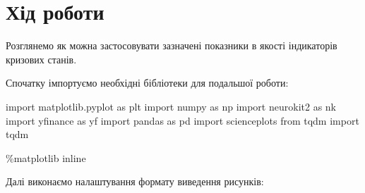 \documentclass[
  letterpaper,
]{report}
\newenvironment{Shaded}{\begin{snugshade}}{\end{snugshade}}
\newcommand{\ImportTok}[1]{\textcolor[rgb]{0.00,0.46,0.62}{#1}}
\newcommand{\NormalTok}[1]{\textcolor[rgb]{0.00,0.23,0.31}{#1}}
\newcommand{\OperatorTok}[1]{\textcolor[rgb]{0.37,0.37,0.37}{#1}}
\begin{document}
\hypertarget{ux445ux456ux434-ux440ux43eux431ux43eux442ux438-5}{%
\section{Хід
роботи}\label{ux445ux456ux434-ux440ux43eux431ux43eux442ux438-5}}

Розглянемо як можна застосовувати зазначені показники в якості
індикаторів кризових станів.

Спочатку імпортуємо необхідні бібліотеки для подальшої роботи:

\begin{Shaded}
\begin{Highlighting}[]
\ImportTok{import}\NormalTok{ matplotlib.pyplot }\ImportTok{as}\NormalTok{ plt }
\ImportTok{import}\NormalTok{ numpy }\ImportTok{as}\NormalTok{ np}
\ImportTok{import}\NormalTok{ neurokit2 }\ImportTok{as}\NormalTok{ nk}
\ImportTok{import}\NormalTok{ yfinance }\ImportTok{as}\NormalTok{ yf}
\ImportTok{import}\NormalTok{ pandas }\ImportTok{as}\NormalTok{ pd}
\ImportTok{import}\NormalTok{ scienceplots}
\ImportTok{from}\NormalTok{ tqdm }\ImportTok{import}\NormalTok{ tqdm}

\OperatorTok{\%}\NormalTok{matplotlib inline}
\end{Highlighting}
\end{Shaded}

Далі виконаємо налаштування формату виведення рисунків:
\end{document}
